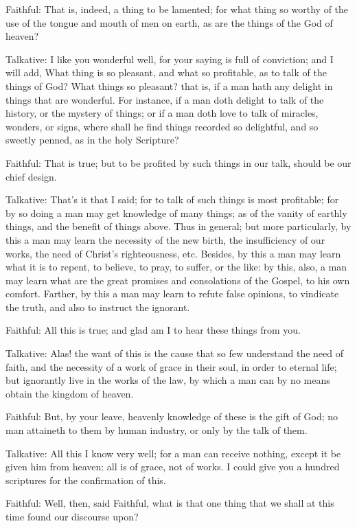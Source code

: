 Faithful: That is, indeed, a thing to be lamented; for what thing so worthy of the use of the tongue and mouth of men on earth, as are the things of the God of heaven?

Talkative: I like you wonderful well, for your saying is full of conviction; and I will add, What thing is so pleasant, and what so profitable, as to talk of the things of God? What things so pleasant? that is, if a man hath any delight in things that are wonderful. For instance, if a man doth delight to talk of the history, or the mystery of things; or if a man doth love to talk of miracles, wonders, or signs, where shall he find things recorded so delightful, and so sweetly penned, as in the holy Scripture?

Faithful: That is true; but to be profited by such things in our talk, should be our chief design.

Talkative: That's it that I said; for to talk of such things is most profitable; for by so doing a man may get knowledge of many things; as of the vanity of earthly things, and the benefit of things above. Thus in general; but more particularly, by this a man may learn the necessity of the new birth, the insufficiency of our works, the need of Christ's righteousness, etc. Besides, by this a man may learn what it is to repent, to believe, to pray, to suffer, or the like: by this, also, a man may learn what are the great promises and consolations of the Gospel, to his own comfort. Farther, by this a man may learn to refute false opinions, to vindicate the truth, and also to instruct the ignorant.

Faithful: All this is true; and glad am I to hear these things from you.

Talkative: Alas! the want of this is the cause that so few understand the need of faith, and the necessity of a work of grace in their soul, in order to eternal life; but ignorantly live in the works of the law, by which a man can by no means obtain the kingdom of heaven.

Faithful: But, by your leave, heavenly knowledge of these is the gift of God; no man attaineth to them by human industry, or only by the talk of them.

Talkative: All this I know very well; for a man can receive nothing, except it be given him from heaven: all is of grace, not of works. I could give you a hundred scriptures for the confirmation of this.

Faithful: Well, then, said Faithful, what is that one thing that we shall at this time found our discourse upon?

